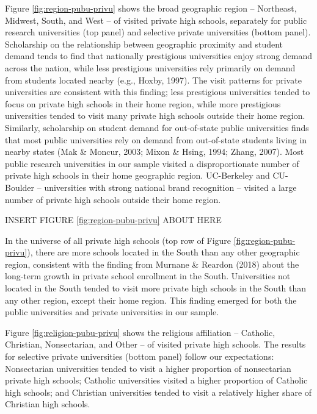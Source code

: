 \documentclass[
  12pt,
]{article}
\begin{document}
Figure \ref{fig:region-pubu-privu} shows the broad geographic region -- Northeast, Midwest, South, and West -- of visited private high schools, separately for public research universities (top panel) and selective private universities (bottom panel). Scholarship on the relationship between geographic proximity and student demand tends to find that nationally prestigious universities enjoy strong demand across the nation, while less prestigious universities rely primarily on demand from students located nearby (e.g., Hoxby, 1997). The visit patterns for private universities are consistent with this finding; less prestigious universities tended to focus on private high schools in their home region, while more prestigious universities tended to visit many private high schools outside their home region. Similarly, scholarship on student demand for out-of-state public universities finds that most public universities rely on demand from out-of-state students living in nearby states (Mak \& Moncur, 2003; Mixon \& Hsing, 1994; Zhang, 2007). Most public research universities in our sample visited a disproportionate number of private high schools in their home geographic region. UC-Berkeley and CU-Boulder -- universities with strong national brand recognition -- visited a large number of private high schools outside their home region.

INSERT FIGURE \ref{fig:region-pubu-privu} ABOUT HERE

In the universe of all private high schools (top row of Figure \ref{fig:region-pubu-privu}), there are more schools located in the South than any other geographic region, consistent with the finding from Murnane \& Reardon (2018) about the long-term growth in private school enrollment in the South. Universities not located in the South tended to visit more private high schools in the South than any other region, except their home region. This finding emerged for both the public universities and private universities in our sample.

Figure \ref{fig:religion-pubu-privu} shows the religious affiliation -- Catholic, Christian, Nonsectarian, and Other -- of visited private high schools. The results for selective private universities (bottom panel) follow our expectations: Nonsectarian universities tended to visit a higher proportion of nonsectarian private high schools; Catholic universities visited a higher proportion of Catholic high schools; and Christian universities tended to visit a relatively higher share of Christian high schools.
\end{document}
